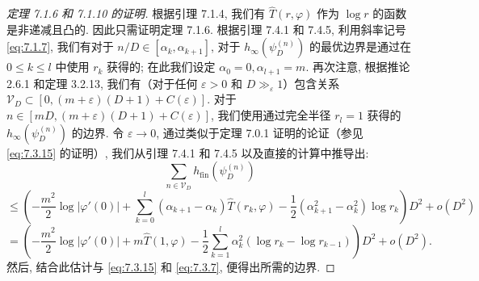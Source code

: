 \begin{proof}[定理 7.1.6 和 7.1.10 的证明]
根据引理 7.1.4, 我们有 \(\widehat{T}(r,\varphi)\) 作为 \(\log r\) 的函数是非递减且凸的. 
因此只需证明定理 7.1.6. 
根据引理 7.4.1 和 7.4.5, 利用斜率记号 \eqref{eq:7.1.7}, 
我们有对于 \(n/D \in [\alpha_k, \alpha_{k+1}]\), 
对于 \(h_{\infty}(\psi_D^{(n)})\) 的最优边界是通过在 \(0 \le k \le l\) 中使用 \(r_k\) 获得的; 
在此我们设定 \(\alpha_0 = 0, \alpha_{l+1} = m\). 
再次注意, 根据推论 2.6.1 和定理 3.2.13, 
我们有（对于任何 \(\varepsilon > 0\) 和 \(D \gg_{\varepsilon} 1\)）包含关系 \(\mathcal{V}_D \subset [0, (m+\varepsilon)(D+1) + C(\varepsilon)]\). 
对于 \(n \in [mD, (m+\varepsilon)(D+1) + C(\varepsilon)]\), 
我们使用通过完全半径 \(r_l = 1\) 获得的 \(h_{\infty}(\psi_D^{(n)})\) 的边界. 
令 \(\varepsilon \to 0\), 通过类似于定理 7.0.1 证明的论证（参见 \eqref{eq:7.3.15} 的证明）, 
我们从引理 7.4.1 和 7.4.5 以及直接的计算中推导出:
\[ \sum_{n \in \mathcal{V}_{D}} h_{\text{fin}}(\psi_{D}^{(n)}) \]
\[ \leq \left(-\frac{m^{2}}{2} \log |\varphi'(0)| + \sum_{k=0}^{l} (\alpha_{k+1} - \alpha_{k}) \widehat{T}(r_{k}, \varphi) - \frac{1}{2} (\alpha_{k+1}^{2} - \alpha_{k}^{2}) \log r_{k}\right) D^{2} + o(D^{2}) \]
\[ = \left(-\frac{m^{2}}{2} \log |\varphi'(0)| + m\widehat{T}(1, \varphi) - \frac{1}{2} \sum_{k=1}^{l} \alpha_{k}^{2} (\log r_{k} - \log r_{k-1})\right) D^{2} + o(D^{2}). \]
然后, 结合此估计与 \eqref{eq:7.3.15} 和 \eqref{eq:7.3.7}, 便得出所需的边界.
\end{proof}

